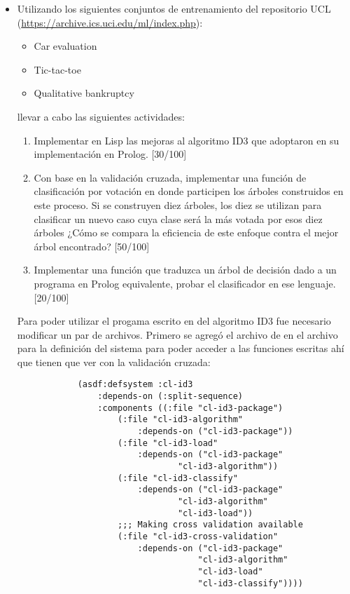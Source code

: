 \begin{itemize}
    \item Utilizando los siguientes conjuntos de entrenamiento del repositorio UCL (\url{https://archive.ics.uci.edu/ml/index.php}):
    \begin{itemize}
        \item Car evaluation
        \item Tic-tac-toe
        \item Qualitative bankruptcy
    \end{itemize}
    llevar a cabo las siguientes actividades:
    \begin{enumerate}
        \item Implementar en Lisp las mejoras al algoritmo ID3 que adoptaron en su implementación en Prolog. [30/100]
        \item Con base en la validación cruzada, implementar una función de clasificación por votación en donde participen los árboles construidos en este proceso. Si se construyen diez árboles, los diez se utilizan para clasificar un nuevo caso cuya clase será la más votada por esos diez árboles ¿Cómo se compara la eficiencia de este enfoque contra el mejor árbol encontrado? [50/100]
        \item Implementar una función que traduzca un árbol de decisión dado a un programa en Prolog equivalente, probar el clasificador en ese lenguaje. [20/100]
    \end{enumerate}
    \begin{solution}
        Para poder utilizar el progama escrito en  del algoritmo ID3 fue necesario modificar un par de archivos. Primero se agregó el archivo de  en el archivo para la definición del sistema  para poder acceder a las funciones escritas ahí que tienen que ver con la validación cruzada:
        \begin{verbatim}
            (asdf:defsystem :cl-id3
                :depends-on (:split-sequence)
                :components ((:file "cl-id3-package")
                    (:file "cl-id3-algorithm"
                        :depends-on ("cl-id3-package"))
                    (:file "cl-id3-load"
                        :depends-on ("cl-id3-package" 
                                "cl-id3-algorithm"))
                    (:file "cl-id3-classify"
                        :depends-on ("cl-id3-package" 
                                "cl-id3-algorithm" 
                                "cl-id3-load"))
                    ;;; Making cross validation available
                    (:file "cl-id3-cross-validation"
                        :depends-on ("cl-id3-package"
                                    "cl-id3-algorithm"
                                    "cl-id3-load"
                                    "cl-id3-classify"))))
        \end{verbatim}


\end{solution}
\end{itemize}

